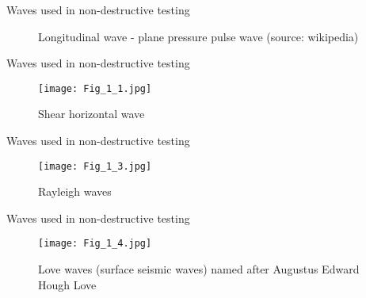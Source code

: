 \documentclass[10pt,aspectratio=169]{beamer} %
\begin{document}
\begin{frame}{Waves used in non-destructive testing}
\begin{figure}
	\caption{\alert{Longitudinal wave}  - plane pressure pulse wave (source: wikipedia)}
\end{figure}
\end{frame}
\note{
	
}
\begin{frame}{Waves used in non-destructive testing}
	\begin{figure}
		\texttt{[image: Fig\_1\_1.jpg]}
		\caption{\alert{Shear horizontal wave} }
	\end{figure}
\end{frame}
\note{
	
}
\begin{frame}{Waves used in non-destructive testing}
	\begin{figure}
		\texttt{[image: Fig\_1\_3.jpg]}
		\caption{\alert{Rayleigh waves} }
	\end{figure}
\end{frame}
\note{
	
}
\begin{frame}{Waves used in non-destructive testing}
	\begin{figure}
		\texttt{[image: Fig\_1\_4.jpg]}
		\caption{\alert{Love waves} (surface seismic waves) named after Augustus Edward Hough Love }
	\end{figure}
\end{frame}
\note{
	
}
\end{document}

